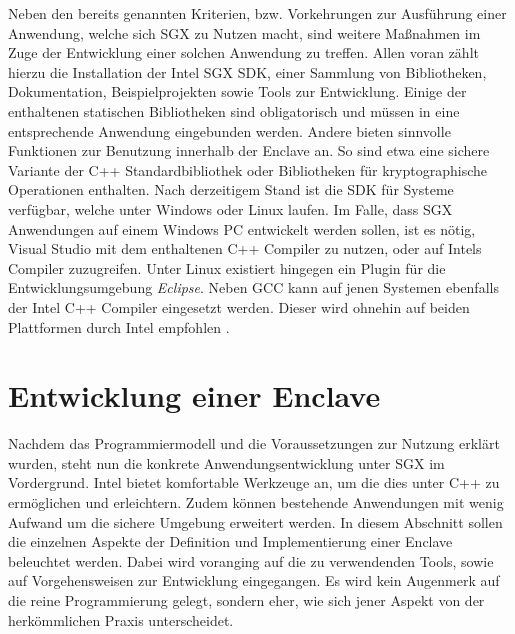 Neben den bereits genannten Kriterien, bzw. Vorkehrungen zur Ausführung einer Anwendung, welche sich SGX zu Nutzen macht, sind weitere Maßnahmen im Zuge der Entwicklung einer solchen Anwendung zu treffen. Allen voran zählt hierzu die Installation der Intel SGX SDK, einer Sammlung von Bibliotheken, Dokumentation, Beispielprojekten sowie Tools zur Entwicklung. Einige der enthaltenen statischen Bibliotheken sind obligatorisch und müssen in eine entsprechende Anwendung eingebunden werden. Andere bieten sinnvolle Funktionen zur Benutzung innerhalb der Enclave an. So sind etwa eine sichere Variante der C++ Standardbibliothek oder Bibliotheken für kryptographische Operationen enthalten. Nach derzeitigem Stand ist die SDK für Systeme verfügbar, welche unter Windows oder Linux laufen. Im Falle, dass SGX Anwendungen auf einem Windows PC entwickelt werden sollen, ist es nötig, Visual Studio mit dem enthaltenen C++ Compiler zu nutzen, oder auf Intels Compiler zuzugreifen. Unter Linux existiert hingegen ein Plugin für die Entwicklungsumgebung \textit{Eclipse}. Neben GCC kann auf jenen Systemen ebenfalls der Intel C++ Compiler eingesetzt werden. Dieser wird ohnehin auf beiden Plattformen durch Intel empfohlen \cite{WinDev}.

\section{Entwicklung einer Enclave}

Nachdem das Programmiermodell und die Voraussetzungen zur Nutzung erklärt wurden, steht nun die konkrete Anwendungsentwicklung unter SGX im Vordergrund. Intel bietet komfortable Werkzeuge an, um die dies unter C++ zu ermöglichen und erleichtern. Zudem können bestehende Anwendungen mit wenig Aufwand um die sichere Umgebung erweitert werden. In diesem Abschnitt sollen die einzelnen Aspekte der Definition und Implementierung einer Enclave beleuchtet werden. Dabei wird voranging auf die zu verwendenden Tools, sowie auf Vorgehensweisen zur Entwicklung eingegangen. Es wird kein Augenmerk auf die reine Programmierung gelegt, sondern eher, wie sich jener Aspekt von der herkömmlichen Praxis unterscheidet.

